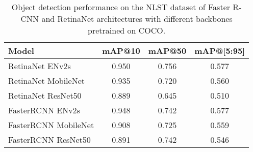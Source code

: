 \begin{table}[h]
    \centering
    \begin{tabular}{lccc}
        \hline
        \textbf{Model} & \textbf{mAP@10} & \textbf{mAP@50} & \textbf{mAP@[5:95]} \\
        \hline
        \rowcolor{yellow!20}
        RetinaNet ENv2s      & 0.950 & 0.756 & 0.577 \\
        RetinaNet MobileNet  & 0.935 & 0.720 & 0.560  \\
        RetinaNet ResNet50   & 0.889 & 0.645 & 0.510  \\
        FasterRCNN ENv2s     & 0.948 & 0.742 & 0.577  \\
        FasterRCNN MobileNet & 0.908 & 0.725 & 0.559  \\
        FasterRCNN ResNet50  & 0.891 & 0.742 & 0.546  \\
        \hline
    \end{tabular}
    \caption{Object detection performance on the NLST dataset of Faster R-CNN and RetinaNet architectures with different backbones pretrained on COCO.}
    \label{tab:nlst-models}
\end{table}